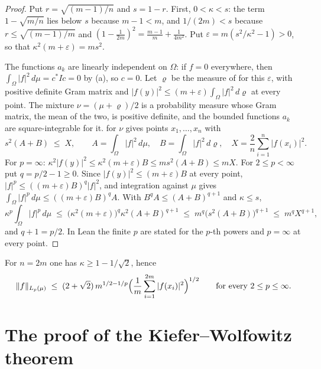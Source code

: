 \begin{proof}
\leanok
{}
Put $r = \sqrt{(m-1)/n}$ and $s = 1 - r$. First, $0 < \kappa < s$: the term
$1 - \sqrt{m/n}$ lies below $s$ because $m - 1 < m$, and $1/(2m) < s$ because
$r \leq \sqrt{(m-1)/m}$ and $(1 - \frac{1}{2m})^2 = \frac{m-1}{m} + \frac{1}{4m^2}$. Put
$\varepsilon = m (s^2/\kappa^2 - 1) > 0$, so that $\kappa^2 (m + \varepsilon) = m s^2$.

The functions $a_k$ are linearly independent on $\Omega$: if $f = 0$ everywhere, then
$\int_\Omega |f|^2 \, d\mu = c^* I c = 0$ by (a), so $c = 0$. Let
$\varrho$ be the measure of  for this $\varepsilon$, with
positive definite Gram matrix and
$|f(y)|^2 \leq (m + \varepsilon) \int_\Omega |f|^2 \, d\varrho$ at every point. The mixture
$\nu = (\mu + \varrho)/2$ is a probability measure whose Gram matrix, the mean of the two,
is positive definite, and the bounded functions $a_k$ are square-integrable for it.
 for $\nu$ gives points $x_1, \dots, x_n$ with
\[
  s^2 (A + B) \;\leq\; X, \qquad
  A = \int_\Omega |f|^2 \, d\mu, \quad B = \int_\Omega |f|^2 \, d\varrho, \quad
  X = \frac{2}{n} \sum_{i=1}^n |f(x_i)|^2 .
\]
For $p = \infty$:
$\kappa^2 |f(y)|^2 \leq \kappa^2 (m + \varepsilon) B \leq m s^2 (A + B) \leq m X$. For
$2 \leq p < \infty$ put $q = p/2 - 1 \geq 0$. Since $|f(y)|^2 \leq (m + \varepsilon) B$ at every
point, $|f|^p \leq ((m + \varepsilon) B)^q |f|^2$, and integration against $\mu$ gives
$\int_\Omega |f|^p \, d\mu \leq ((m + \varepsilon) B)^q A$. With $B^q A \leq (A + B)^{q+1}$
and $\kappa \leq s$,
\[
  \kappa^p \int_\Omega |f|^p \, d\mu
  \;\leq\; \bigl( \kappa^2 (m + \varepsilon) \bigr)^q \kappa^2 (A + B)^{q+1}
  \;\leq\; m^q \bigl( s^2 (A + B) \bigr)^{q+1}
  \;\leq\; m^q X^{q+1},
\]
and $q + 1 = p/2$. In Lean the finite $p$ are stated for the $p$-th powers and $p = \infty$
at every point.
\end{proof}

For $n = 2m$ one has $\kappa \geq 1 - 1/\sqrt{2}$, hence
\[
  \|f\|_{L_p(\mu)} \; \leq \; (2 + \sqrt{2}) \, m^{1/2 - 1/p}
    \Bigl( \frac{1}{m} \sum_{i=1}^{2m} |f(x_i)|^2 \Bigr)^{1/2}
  \qquad \text{for every } 2 \leq p \leq \infty .
\]

\section{The proof of the Kiefer--Wolfowitz theorem}
\label{sec:optimal-design-proof}

